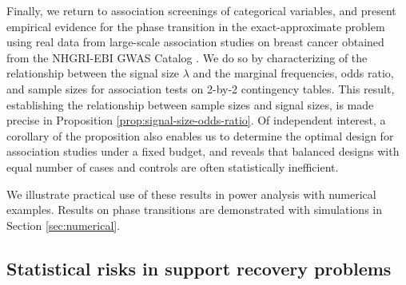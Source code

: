Finally, we return to association screenings of categorical variables, and 
present empirical evidence for the phase transition in the exact-approximate problem using real data from large-scale association studies on breast cancer obtained from the NHGRI-EBI GWAS Catalog \cite{macarthur2016new}.
We do so by characterizing of the relationship between the signal size $\lambda$ and the marginal frequencies, odds ratio, and sample sizes for association tests on 2-by-2 contingency tables.
This result, establishing the relationship between sample sizes and signal sizes, is made precise in Proposition \ref{prop:signal-size-odds-ratio}.
Of independent interest, a corollary of the proposition also enables us to determine the optimal design for association studies under a fixed budget, and reveals that balanced designs with equal number of cases and controls are often statistically inefficient.

We illustrate practical use of these results in power analysis with numerical examples. Results on phase transitions are demonstrated with simulations in Section \ref{sec:numerical}.


\subsection{Statistical risks in support recovery problems}
\label{subsec:risks}


